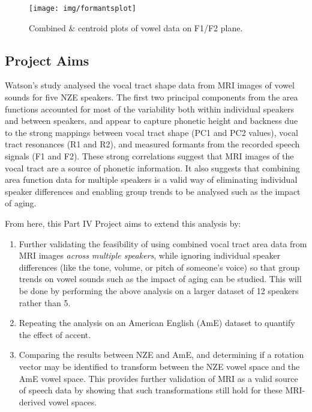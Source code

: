 \begin{figure}[H]
\centering
\texttt{[image: img/formantsplot]}
\caption{Combined \& centroid plots of vowel data on F1/F2 plane.}
\label{fig:formantsplot}
\end{figure}

\subsection{Project Aims}

Watson's \cite{watson2014mappings} study analysed the vocal tract shape data from MRI images of vowel sounds for five NZE speakers. The first two principal components from the area functions accounted for most of the variability both within individual speakers and between speakers, and appear to capture phonetic height and backness due to the strong mappings between vocal tract shape (PC1 and PC2 values), vocal tract resonances (R1 and R2), and measured formants from the recorded speech signals (F1 and F2). These strong correlations suggest that MRI images of the vocal tract are a source of phonetic information. It also suggests that combining area function data for multiple speakers is a valid way of eliminating individual speaker differences and enabling group trends to be analysed such as the impact of aging.

From here, this Part IV Project aims to extend this analysis by:

\begin{enumerate}
    \item Further validating the feasibility of using combined vocal tract area data from MRI images \textit{across multiple speakers}, while ignoring individual speaker differences (like the tone, volume, or pitch of someone’s voice) so that group trends on vowel sounds such as the impact of aging can be studied. This will be done by performing the above analysis on a larger dataset of 12 speakers rather than 5.
    \item Repeating the analysis on an American English (AmE) dataset to quantify the effect of accent.
    \item Comparing the results between NZE and AmE, and determining if a rotation vector may be identified to transform between the NZE vowel space and the AmE vowel space. This provides further validation of MRI as a valid source of speech data by showing that such transformations still hold for these MRI-derived vowel spaces.
\end{enumerate}